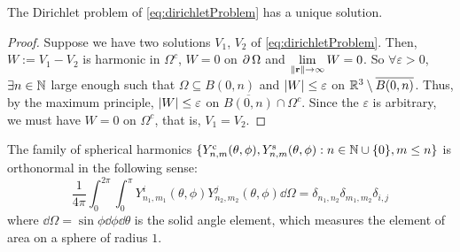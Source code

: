 \documentclass[../main.tex]{subfiles}
\begin{document}
\begin{corollary}
  The Dirichlet problem of \cref{eq:dirichletProblem} has a unique solution.
\end{corollary}
\begin{proof}
  Suppose we have two solutions $V_1$, $V_2$ of \cref{eq:dirichletProblem}. Then, $W:=V_1-V_2$ is harmonic in $\Omega^c$, $W=0$ on $\operatorname{\partial}{\Omega}$ and $\displaystyle\lim_{\left\|\boldsymbol{\mathrm{r}}\right\|\to\infty}W=0$. So $\forall\varepsilon>0$, $\exists n\in\mathbb{N}$ large enough such that $\Omega \subseteq B(0,n)$ and $\abs{W}\leq \varepsilon$ on $\mathbb{R}^3\setminus \overline{B(0,n)}$. Thus, by the maximum principle, $\abs{W}\leq \varepsilon$ on $\overline{B(0,n)}\cap \Omega^c$. Since the $\varepsilon$ is arbitrary, we must have $W=0$ on $\Omega^c$, that is, $V_1=V_2$.
\end{proof}
\begin{proposition}
  The family of spherical harmonics $\{Y_{n,m}^{\mathrm{c}}(\theta,\phi),Y_{n,m}^{\mathrm{s}}(\theta,\phi):n\in\mathbb{N}\cup\{0\},m\leq n\}$ is orthonormal in the following sense:
  \begin{equation}\label{eq:ortho_spherical_harmonics}
    \frac{1}{4\pi}\int_0^{2\pi}\int_0^\pi Y_{n_1,m_1}^i(\theta,\phi) Y_{n_2,m_2}^j(\theta,\phi)\dd\Omega=\delta_{n_1,n_2}\delta_{m_1,m_2}\delta_{i,j}
  \end{equation}
  where $\dd\Omega=\sin\phi\dd{\phi}\dd{\theta}$ is the solid angle element, which measures the element of area on a sphere of radius $1$.
\end{proposition}
\end{document}
